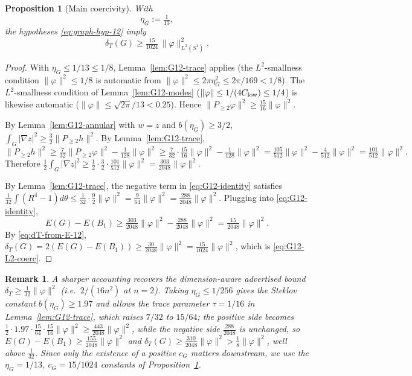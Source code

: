\documentclass[11pt]{amsart}
\newtheorem{proposition}[theorem]{Proposition}
\newtheorem{remark}[theorem]{Remark}
\newcommand{\dT}{\delta_T}
\begin{document}
\begin{proposition}[Main coercivity]\label{prop:G12-coercive}
With
\begin{equation}\label{eq:G12-eta-choice}
   \eta_G:=\tfrac{1}{13},
\end{equation}
the hypotheses \eqref{eq:graph-hyp-12} imply
\begin{equation}\label{eq:G12-L2-coerc}
   \dT(G)\ge \tfrac{15}{1024}\,\|\varphi\|_{L^2(S^1)}^2 .
\end{equation}
\end{proposition}

\begin{proof}
With \(\eta_G\le 1/13\le 1/8\), Lemma~\ref{lem:G12-trace} applies
(the \(L^2\)-smallness condition \(\|\varphi\|^2\le 1/8\) is
automatic from \(\|\varphi\|^2\le 2\pi\eta_G^2\le 2\pi/169<1/8\)).
The \(L^2\)-smallness condition of Lemma~\ref{lem:G12-modes}
(\(\|\varphi\|\le 1/(4C_{\rm low})\le 1/4\)) is likewise automatic
(\(\|\varphi\|\le\sqrt{2\pi}/13<0.25\)).  Hence
\(\|P_{\ge 2}\varphi\|^2\ge\tfrac{15}{16}\|\varphi\|^2\).

By Lemma~\ref{lem:G12-annular} with \(w=z\) and
\(b(\eta_G)\ge 3/2\),
\(\int_G|\nabla z|^2\ge\tfrac{3}{2}\|P_{\ge 2}h\|^2\).
By Lemma~\ref{lem:G12-trace},
\[
   \|P_{\ge 2}h\|^2
     \ge\tfrac{7}{32}\|P_{\ge 2}\varphi\|^2-\tfrac{1}{128}\|\varphi\|^2
     \ge\tfrac{7}{32}\cdot\tfrac{15}{16}\|\varphi\|^2-\tfrac{1}{128}\|\varphi\|^2
     =\tfrac{105}{512}\|\varphi\|^2-\tfrac{4}{512}\|\varphi\|^2
     =\tfrac{101}{512}\|\varphi\|^2 .
\]
Therefore
\(\tfrac12\int_G|\nabla z|^2\ge\tfrac12\cdot\tfrac32\cdot
\tfrac{101}{512}\|\varphi\|^2
=\tfrac{303}{2048}\|\varphi\|^2\).

By Lemma~\ref{lem:G12-trace}, the negative term in
\eqref{eq:G12-identity} satisfies
\(\tfrac{1}{32}\int(R^4-1)d\theta\le\tfrac{1}{32}\cdot\tfrac{9}{2}
\|\varphi\|^2=\tfrac{9}{64}\|\varphi\|^2=\tfrac{288}{2048}\|\varphi\|^2\).
Plugging into \eqref{eq:G12-identity},
\[
   E(G)-E(B_1)
     \ge\tfrac{303}{2048}\|\varphi\|^2-\tfrac{288}{2048}\|\varphi\|^2
     =\tfrac{15}{2048}\|\varphi\|^2 .
\]
By \eqref{eq:dT-from-E-12},
\(\dT(G)=2(E(G)-E(B_1))\ge\tfrac{30}{2048}\|\varphi\|^2
=\tfrac{15}{1024}\|\varphi\|^2\), which is \eqref{eq:G12-L2-coerc}.
\end{proof}

\begin{remark}\label{rem:G12summary}
A sharper accounting recovers the dimension-aware advertised bound
\(\dT\ge\tfrac{1}{32}\|\varphi\|^2\) (i.e.\ \(2/(16n^2)\) at
\(n=2\)).  Taking \(\eta_G\le 1/256\) gives the Steklov constant
\(b(\eta_G)\ge 1.97\) and allows the trace parameter \(\tau=1/16\) in
Lemma~\ref{lem:G12-trace}, which raises \(7/32\) to \(15/64\); the
positive side becomes \(\tfrac12\cdot 1.97\cdot\tfrac{15}{64}
\cdot\tfrac{15}{16}\|\varphi\|^2\ge\tfrac{443}{2048}\|\varphi\|^2\),
while the negative side \(\tfrac{288}{2048}\) is unchanged, so
\(E(G)-E(B_1)\ge\tfrac{155}{2048}\|\varphi\|^2\) and
\(\dT(G)\ge\tfrac{310}{2048}\|\varphi\|^2>\tfrac{1}{8}
\|\varphi\|^2\), well above \(\tfrac{1}{32}\).  Since only the
existence of a positive \(c_G\) matters downstream, we use the
\(\eta_G=1/13\), \(c_G=15/1024\) constants of
Proposition~\ref{prop:G12-coercive}.
\end{remark}
\end{document}
